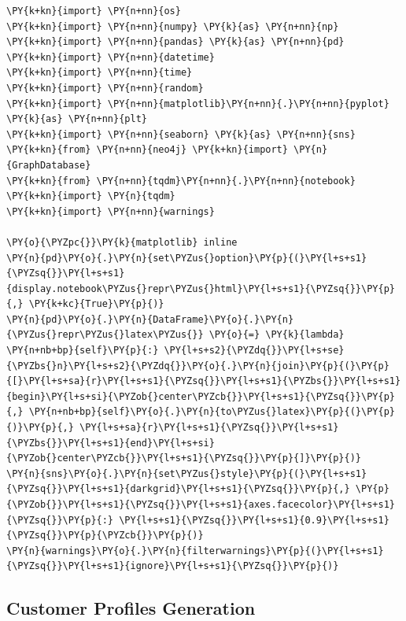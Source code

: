     \begin{tcolorbox}[breakable, size=fbox, boxrule=1pt, pad at break*=1mm,colback=cellbackground, colframe=cellborder]
\begin{Verbatim}[commandchars=\\\{\}]
\PY{k+kn}{import} \PY{n+nn}{os}
\PY{k+kn}{import} \PY{n+nn}{numpy} \PY{k}{as} \PY{n+nn}{np}
\PY{k+kn}{import} \PY{n+nn}{pandas} \PY{k}{as} \PY{n+nn}{pd}
\PY{k+kn}{import} \PY{n+nn}{datetime}
\PY{k+kn}{import} \PY{n+nn}{time}
\PY{k+kn}{import} \PY{n+nn}{random}
\PY{k+kn}{import} \PY{n+nn}{matplotlib}\PY{n+nn}{.}\PY{n+nn}{pyplot} \PY{k}{as} \PY{n+nn}{plt}
\PY{k+kn}{import} \PY{n+nn}{seaborn} \PY{k}{as} \PY{n+nn}{sns}
\PY{k+kn}{from} \PY{n+nn}{neo4j} \PY{k+kn}{import} \PY{n}{GraphDatabase}
\PY{k+kn}{from} \PY{n+nn}{tqdm}\PY{n+nn}{.}\PY{n+nn}{notebook} \PY{k+kn}{import} \PY{n}{tqdm}
\PY{k+kn}{import} \PY{n+nn}{warnings}

\PY{o}{\PYZpc{}}\PY{k}{matplotlib} inline
\PY{n}{pd}\PY{o}{.}\PY{n}{set\PYZus{}option}\PY{p}{(}\PY{l+s+s1}{\PYZsq{}}\PY{l+s+s1}{display.notebook\PYZus{}repr\PYZus{}html}\PY{l+s+s1}{\PYZsq{}}\PY{p}{,} \PY{k+kc}{True}\PY{p}{)}
\PY{n}{pd}\PY{o}{.}\PY{n}{DataFrame}\PY{o}{.}\PY{n}{\PYZus{}repr\PYZus{}latex\PYZus{}} \PY{o}{=} \PY{k}{lambda} \PY{n+nb+bp}{self}\PY{p}{:} \PY{l+s+s2}{\PYZdq{}}\PY{l+s+se}{\PYZbs{}n}\PY{l+s+s2}{\PYZdq{}}\PY{o}{.}\PY{n}{join}\PY{p}{(}\PY{p}{[}\PY{l+s+sa}{r}\PY{l+s+s1}{\PYZsq{}}\PY{l+s+s1}{\PYZbs{}}\PY{l+s+s1}{begin}\PY{l+s+si}{\PYZob{}center\PYZcb{}}\PY{l+s+s1}{\PYZsq{}}\PY{p}{,} \PY{n+nb+bp}{self}\PY{o}{.}\PY{n}{to\PYZus{}latex}\PY{p}{(}\PY{p}{)}\PY{p}{,} \PY{l+s+sa}{r}\PY{l+s+s1}{\PYZsq{}}\PY{l+s+s1}{\PYZbs{}}\PY{l+s+s1}{end}\PY{l+s+si}{\PYZob{}center\PYZcb{}}\PY{l+s+s1}{\PYZsq{}}\PY{p}{]}\PY{p}{)}
\PY{n}{sns}\PY{o}{.}\PY{n}{set\PYZus{}style}\PY{p}{(}\PY{l+s+s1}{\PYZsq{}}\PY{l+s+s1}{darkgrid}\PY{l+s+s1}{\PYZsq{}}\PY{p}{,} \PY{p}{\PYZob{}}\PY{l+s+s1}{\PYZsq{}}\PY{l+s+s1}{axes.facecolor}\PY{l+s+s1}{\PYZsq{}}\PY{p}{:} \PY{l+s+s1}{\PYZsq{}}\PY{l+s+s1}{0.9}\PY{l+s+s1}{\PYZsq{}}\PY{p}{\PYZcb{}}\PY{p}{)}
\PY{n}{warnings}\PY{o}{.}\PY{n}{filterwarnings}\PY{p}{(}\PY{l+s+s1}{\PYZsq{}}\PY{l+s+s1}{ignore}\PY{l+s+s1}{\PYZsq{}}\PY{p}{)}
\end{Verbatim}
\end{tcolorbox}

    \hypertarget{customer-profiles-generation}{%
\subsection{Customer Profiles
Generation}\label{customer-profiles-generation}}

